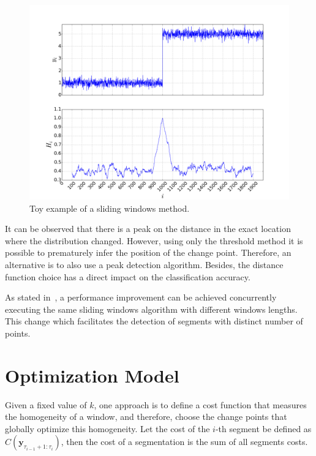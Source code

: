 \begin{figure}[H]
    \centering
    \includegraphics[width=1.0\textwidth]{./figures/change_point_detection/sliding_window_toy_example.png}
    \caption{Toy example of a sliding windows method.}
    \label{fig:sliding_window_toy_example}
\end{figure}%

It can be observed that there is a peak on the distance in the exact location where the distribution changed. However, using only the threshold method it is possible to prematurely infer the position of the change point. Therefore, an alternative is to also use a peak detection algorithm. Besides, the distance function choice has a direct impact on the classification accuracy.

As stated in~\cite{detecting_change_in_data_streams}, a performance improvement can be achieved concurrently executing the same sliding windows algorithm with different windows lengths. This change which facilitates the detection of segments with distinct number of points.

\section{Optimization Model}  

Given a fixed value of $k$, one approach is to define a cost function that measures the homogeneity of a window, and therefore, choose the change points that globally optimize this homogeneity. Let the cost of the $i$-th segment be defined as $C(\mathbf{y}_{\tau_{i - 1} + 1 : \tau_{i}})$, then the cost of a segmentation is the sum of all segments costs.

